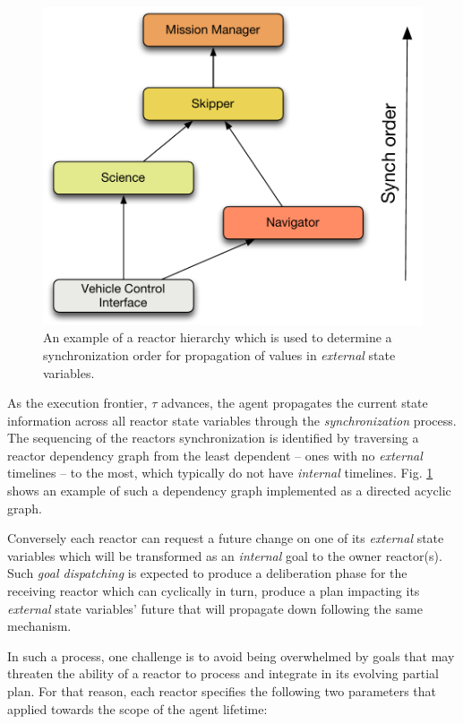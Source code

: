 \begin{figure}[!htbp]
  \centering
  \includegraphics[scale=0.35]{figs/DAG-hierarchy}
  \caption{\small An example of a \rx reactor hierarchy which is used
    to determine a synchronization order for propagation of values in
    \emph{external} state variables.}
  \label{fig:reactor-DAG}
\end{figure}

As the execution frontier, $\tau$ advances, the \rx agent propagates
the current state information across all reactor state variables
through the {\em synchronization} process.  The sequencing of the
reactors synchronization is identified by traversing a reactor
dependency graph from the least dependent -- ones with no {\em
  external} timelines -- to the most, \ie which typically do not have
{\em internal} timelines. Fig. \ref{fig:reactor-DAG} shows an example
of such a dependency graph implemented as a directed acyclic graph.

Conversely each reactor can request a future change on one of its {\em
  external} state variables which will be transformed as an {\em
  internal} goal to the owner reactor(s).  Such \emph{goal
  dispatching} is expected to produce a deliberation phase for the
receiving reactor which can cyclically in turn, produce a plan
impacting its {\em external} state variables' future that will
propagate down following the same mechanism.

In such a process, one challenge is to avoid being overwhelmed by
goals that may threaten the ability of a reactor to process and
integrate in its evolving partial plan. For that reason, each reactor
specifies the following two parameters that applied towards the scope
of the agent lifetime:


